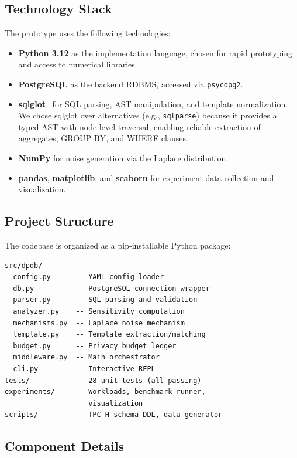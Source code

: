 \documentclass[sigconf,nonacm]{acmart}
\begin{document}
\subsection{Technology Stack}

The prototype uses the following technologies:
\begin{itemize}
    \item \textbf{Python 3.12} as the implementation language, chosen for rapid prototyping and access to numerical libraries.
    \item \textbf{PostgreSQL} as the backend RDBMS, accessed via \texttt{psycopg2}.
    \item \textbf{sqlglot}~\cite{sqlglot} for SQL parsing, AST manipulation, and template normalization. We chose sqlglot over alternatives (e.g., \texttt{sqlparse}) because it provides a typed AST with node-level traversal, enabling reliable extraction of aggregates, GROUP BY, and WHERE clauses.
    \item \textbf{NumPy} for noise generation via the Laplace distribution.
    \item \textbf{pandas}, \textbf{matplotlib}, and \textbf{seaborn} for experiment data collection and visualization.
\end{itemize}

\subsection{Project Structure}

The codebase is organized as a pip-installable Python package:

\begin{verbatim}
src/dpdb/
  config.py      -- YAML config loader
  db.py          -- PostgreSQL connection wrapper
  parser.py      -- SQL parsing and validation
  analyzer.py    -- Sensitivity computation
  mechanisms.py  -- Laplace noise mechanism
  template.py    -- Template extraction/matching
  budget.py      -- Privacy budget ledger
  middleware.py  -- Main orchestrator
  cli.py         -- Interactive REPL
tests/           -- 28 unit tests (all passing)
experiments/     -- Workloads, benchmark runner,
                    visualization
scripts/         -- TPC-H schema DDL, data generator
\end{verbatim}

\subsection{Component Details}
\end{document}
